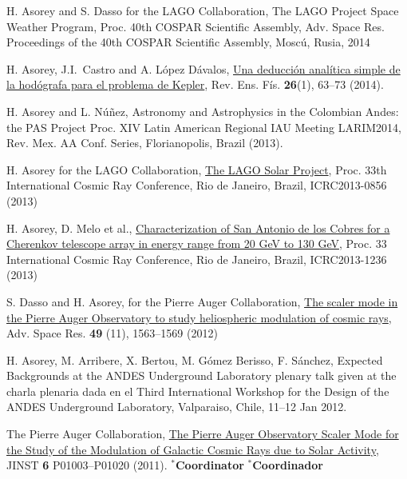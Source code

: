 \begin{etaremune}
\item {}H. Asorey and S. Dasso for the LAGO Collaboration, {{The LAGO Project Space Weather Program}}, \en Proc. 40th COSPAR Scientific Assembly, Adv. Space Res. \in Proceedings of the 40th COSPAR Scientific Assembly, Moscú, Rusia, 2014

\item {}H. Asorey, J.I.\ Castro and A. López Dávalos, \href{http://www.revistas.unc.edu.ar/index.php/revistaEF/article/view/9512}{{Una deducción analítica simple de la hodógrafa para el problema de Kepler}}, Rev. Ens. Fís. {\textbf{26}}(1), 63--73 (2014).

\item {}H. Asorey and L. Núñez, {{Astronomy and Astrophysics in the Colombian Andes: the PAS Project}} \en Proc.
XIV Latin American Regional IAU Meeting LARIM2014, Rev. Mex. AA Conf. Series, Florianopolis, Brazil (2013).

\item {}H. Asorey for the LAGO Collaboration, \href{https://www.cbpf.br/~icrc2013/papers/icrc2013-0856.pdf}{The LAGO Solar Project}, \en Proc. 33th International Cosmic Ray Conference, Rio de Janeiro, Brazil, ICRC2013-0856 (2013)

\item {}H. Asorey, D. Melo {{et al.}}, \href{https://www.cbpf.br/~icrc2013/papers/icrc2013-1236.pdf}{Characterization of San Antonio de los Cobres for a Cherenkov telescope array in energy range from 20 GeV to 130 GeV}, \en Proc. 33 International Cosmic Ray Conference, Rio de Janeiro, Brazil, ICRC2013-1236 (2013)

\item {}S. Dasso and H. Asorey, for the Pierre Auger Collaboration, \href{http://dx.doi.org/10.1016/j.asr.2011.12.028}{{The scaler mode in
the Pierre Auger Observatory to study heliospheric modulation of cosmic rays}}, Adv. Space Res. {\textbf{49}} (11), 1563--1569 (2012)

\item {} H. Asorey, M. Arribere, X. Bertou, M. Gómez Berisso, F. Sánchez,
{{Expected Backgrounds at the ANDES Underground Laboratory}}
\ifeng
plenary talk given at the
\else 
charla plenaria dada en el
\fi
Third International Workshop for the Design of the ANDES Underground Laboratory, Valparaiso, Chile, 11--12 Jan 2012.

\item {}The Pierre Auger Collaboration,
\href{http://dx.doi.org/10.1088/1748-0221/6/01/P01003}{{The Pierre Auger
Observatory Scaler Mode for the Study of the Modulation of Galactic Cosmic Rays
due to Solar Activity}}, JINST {\textbf 6} P01003--P01020 (2011). \ifeng $^*${\textbf{Coordinator}} \else $^*${\textbf{Coordinador}} \fi


\end{etaremune}
